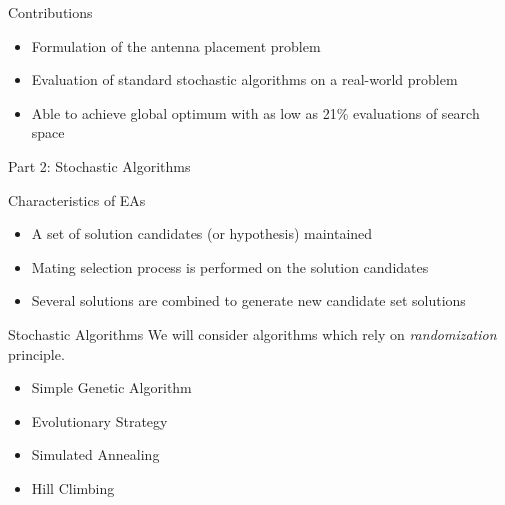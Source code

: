 \documentclass{beamer}
\begin{document}
    \begin{frame}[t]{Contributions}
        \begin{itemize}
            \item Formulation of the antenna placement problem
            \item Evaluation of standard stochastic algorithms on a real-world problem
            \item Able to achieve global optimum with as low as 21\% evaluations of search space
        \end{itemize}
        \vspace{5mm}
    \end{frame}


    \begin{frame}{\null}
        \begin{tcolorbox}[colback=green!5]
            \centering\Huge
            Part 2: Stochastic Algorithms
        \end{tcolorbox}
    \end{frame}
    \begin{frame}[t]{Characteristics of EAs}
    \begin{itemize} \itemsep1.5em
            \item A set of solution candidates (or hypothesis) maintained
            \item Mating selection process is performed on the solution candidates
            \item Several solutions are combined to generate new candidate set solutions
        \end{itemize}
    \end{frame}

    \begin{frame}[t]{Stochastic Algorithms}
        We will consider algorithms which rely on \textit{randomization} principle.
        \vspace{10px}
    \begin{itemize} \itemsep1.5em
            \item Simple Genetic Algorithm
            \item Evolutionary Strategy
            \item Simulated Annealing
            \item Hill Climbing
        \end{itemize}
    \end{frame}
\end{document}
